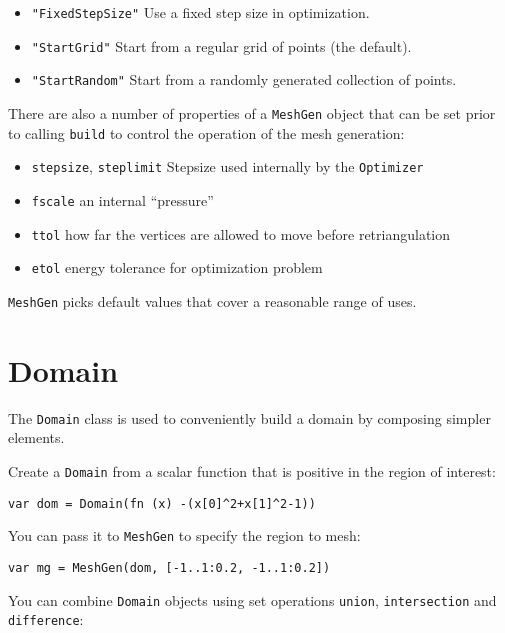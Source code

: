\begin{itemize}

\item
  \texttt{"FixedStepSize"} Use a fixed step size in optimization.
\item
  \texttt{"StartGrid"} Start from a regular grid of points (the
  default).
\item
  \texttt{"StartRandom"} Start from a randomly generated collection of
  points.
\end{itemize}

There are also a number of properties of a \texttt{MeshGen} object that
can be set prior to calling \texttt{build} to control the operation of
the mesh generation:

\begin{itemize}

\item
  \texttt{stepsize}, \texttt{steplimit} Stepsize used internally by the
  \texttt{Optimizer}
\item
  \texttt{fscale} an internal ``pressure''
\item
  \texttt{ttol} how far the vertices are allowed to move before
  retriangulation
\item
  \texttt{etol} energy tolerance for optimization problem
\end{itemize}

\texttt{MeshGen} picks default values that cover a reasonable range of
uses.

\hypertarget{domain}{%
\section{Domain}\label{domain}}

The \texttt{Domain} class is used to conveniently build a domain by
composing simpler elements.

Create a \texttt{Domain} from a scalar function that is positive in the
region of interest:

\begin{lstlisting}
var dom = Domain(fn (x) -(x[0]^2+x[1]^2-1))
\end{lstlisting}

You can pass it to \texttt{MeshGen} to specify the region to mesh:

\begin{lstlisting}
var mg = MeshGen(dom, [-1..1:0.2, -1..1:0.2])
\end{lstlisting}

You can combine \texttt{Domain} objects using set operations
\texttt{union}, \texttt{intersection} and \texttt{difference}:

